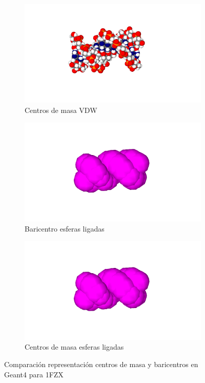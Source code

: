 \begin{figure}
\begin{subfigure}{.4\textwidth}
  \centering
  \includegraphics[width=.78\linewidth]{./Figures/1fzxvdw.png}
  \caption{Centros de masa VDW}
  \label{fig:sub444}
\end{subfigure}
\begin{subfigure}{.4\textwidth}
  \centering
  \includegraphics[width=.78\linewidth]{./Figures/1fzxba.png}
  \caption{Baricentro esferas ligadas}
  \label{fig:sub555}
\end{subfigure}%
\begin{subfigure}{.4\textwidth}
  \centering
  \includegraphics[width=.78\linewidth]{./Figures/1fzxba.png}
  \caption{Centros de masa esferas ligadas}
  \label{fig:sub666}
\end{subfigure}
\caption[Comparación de centros de masa y baricentros en Geant4 1FZX]{Comparación representación centros de masa y baricentros en Geant4 para 1FZX}
\label{hh}
\end{figure}





